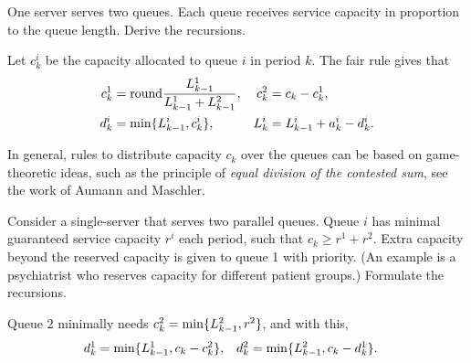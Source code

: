 \begin{exercise} \label{ex:51}
 One server serves two queues. 
 Each queue receives service capacity in proportion to the queue length.
 Derive the recursions.
\begin{solution}
 Let $c_k^i$ be the capacity allocated to queue $i$ in period $k$. The fair rule gives that
 \begin{align*}
 c_k^1 &= \text{round} \frac{L_{k-1}^1}{L_{k-1}^1 + L_{k-1}^2}, &  c_k^2 &= c_k - c_k^1, \\
 d_k^i &= \min\{L_{k-1}^i, c^i_k\}, & L_k^i &= L_{k-1}^i+a_k^i - d_k^i.
 \end{align*}

 In general, rules to distribute capacity $c_k$ over the queues can be based on game-theoretic ideas, such as the principle of \textit{equal division of the contested sum}, see the work of  Aumann and Maschler.
\end{solution}
\end{exercise}




\begin{exercise}
 Consider  a single-server that serves two parallel queues.
Queue $i$ has minimal guaranteed service capacity $r^i$ each  period, such that $c_k \geq r^1 + r^2$.
 Extra capacity beyond the reserved capacity is given to queue 1 with priority.
(An example is a psychiatrist who reserves capacity for different  patient groups.)
 Formulate the recursions.
\begin{solution}
  Queue $2$ minimally needs $c_{k}^2 = \min\{L_{k-1}^2, r^2\}$, and with this,
  \begin{align*}
 d_{k}^1 &= \min\{L_{k-1}^1, c_k-c_{k}^2\}, & d_{k}^2 &= \min\{L_{k-1}^2, c_k-d_{k}^1\}.
  \end{align*}
\end{solution}
\end{exercise}


